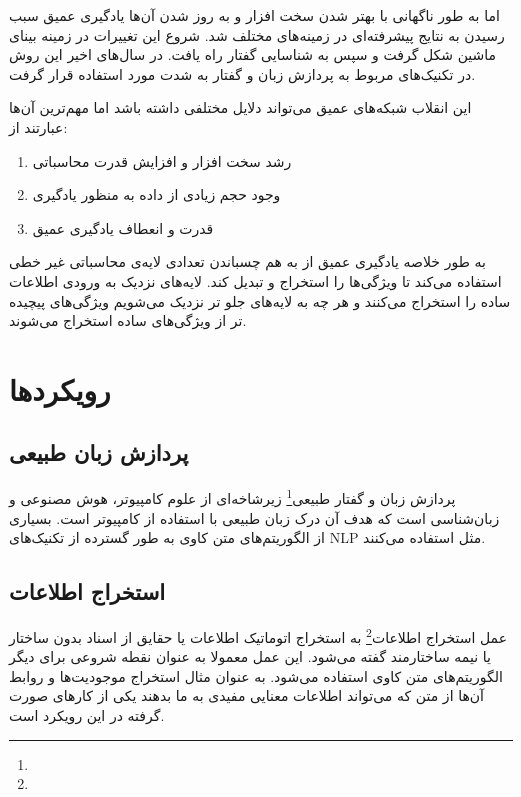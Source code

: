 \documentclass[12pt, a4paper, oneside]{report}
\begin{document}
اما به طور ناگهانی با بهتر شدن سخت افزار و به روز شدن آن‌ها یادگیری عمیق سبب رسیدن به نتایج پیشرفته‌ای در زمینه‌های مختلف شد.
شروع این تغییرات در زمینه بینای ماشین شکل گرفت و سپس به شناسایی گفتار راه یافت. در سال‌های اخیر این روش در تکنیک‌های
مربوط به پردازش زبان و گفتار به شدت مورد استفاده قرار گرفت.

این انقلاب شبکه‌های عمیق می‌تواند دلایل مختلفی داشته باشد اما مهم‌ترین آن‌ها عبارتند از:

\begin{enumerate}
	\item رشد سخت افزار و افزایش قدرت محاسباتی
	\item وجود حجم زیادی از داده به منظور یادگیری
	\item قدرت و انعطاف یادگیری عمیق
\end{enumerate}

به طور خلاصه یادگیری عمیق از به هم چسباندن تعدادی لایه‌ی محاسباتی غیر خطی استفاده می‌کند تا ویژگی‌ها را استخراج و تبدیل کند.
لایه‌های نزدیک به ورودی اطلاعات ساده را استخراج می‌کنند و هر چه به لایه‌های جلو تر نزدیک می‌شویم ویژگی‌های پیچیده تر
از ویژگی‌های ساده استخراج می‌شوند.

\section{رویکردها}

\subsection{پردازش زبان طبیعی}

پردازش زبان و گفتار طبیعی\footnote{}
زیرشاخه‌ای از علوم کامپیوتر، هوش مصنوعی و زبان‌شناسی است که هدف آن درک زبان طبیعی با
استفاده از کامپیوتر است. بسیاری از الگوریتم‌های متن کاوی به طور گسترده از تکنیک‌های
NLP
مثل
استفاده می‌کنند\cite{DBLP:journals/corr/AllahyariPASTGK17a}.

\subsection{استخراج اطلاعات}

عمل 
استخراج اطلاعات\footnote{}
به استخراج اتوماتیک اطلاعات یا حقایق از اسناد بدون ساختار یا نیمه ساختارمند گفته می‌شود.
این عمل معمولا به عنوان نقطه شروعی برای دیگر الگوریتم‌های متن کاوی استفاده می‌شود. به عنوان مثال استخراج
موجودیت‌ها و روابط آن‌ها از متن که می‌تواند اطلاعات معنایی مفیدی به ما بدهند یکی از کار‌های صورت گرفته
در این رویکرد است\cite{DBLP:journals/corr/AllahyariPASTGK17a}.
\end{document}
